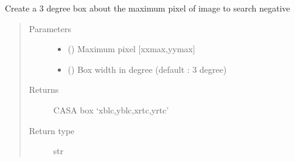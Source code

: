 \documentclass[letterpaper,10pt,english]{sphinxmanual}
\begin{document}
\begin{fulllineitems}
\begin{fulllineitems}
\end{fulllineitems}


\begin{fulllineitems}
\label{\detokenize{paircars:paircars.fullpol_selfcal_LTS.PolSelfcal.negative_box}}
\sphinxAtStartPar
Create a 3 degree box about the maximum pixel of image to search negative
\begin{quote}\begin{description}
\item[{Parameters}] \leavevmode\begin{itemize}
\item {} 
\sphinxAtStartPar
{} () \textendash{} Maximum pixel {[}xxmax,yymax{]}

\item {} 
\sphinxAtStartPar
{} () \textendash{} Box width in degree (default : 3 degree)

\end{itemize}

\item[{Returns}] \leavevmode
\sphinxAtStartPar
CASA box ‘xblc,yblc,xrtc,yrtc’

\item[{Return type}] \leavevmode
\sphinxAtStartPar
str

\end{description}\end{quote}

\end{fulllineitems}



\end{fulllineitems}
\end{document}
